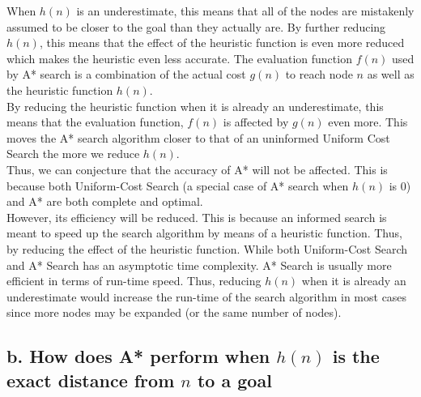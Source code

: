 \documentclass[11pt, A4]{article}
\begin{document}
When $h(n)$ is an underestimate, this means that all of the nodes are mistakenly assumed to be closer to the goal than they actually are. By further reducing $h(n)$, this means that the effect of the heuristic function is even more reduced which makes the heuristic even less accurate. The evaluation function $f(n)$ used by A* search is a combination of the actual cost $g(n)$ to reach node $n$ as well as the heuristic function $h(n)$. \\

\noindent By reducing the heuristic function when it is already an underestimate, this means that the evaluation function, $f(n)$ is affected by $g(n)$ even more. This moves the A* search algorithm closer to that of an uninformed Uniform Cost Search the more we reduce $h(n)$. \\

\noindent Thus, we can conjecture that the accuracy of A* will not be affected. This is because both Uniform-Cost Search (a special case of A* search when $h(n)$ is 0) and A* are both complete and optimal. \\

\noindent However, its efficiency will be reduced. This is because an informed search is meant to speed up the search algorithm by means of a heuristic function. Thus, by reducing the effect of the heuristic function. While both Uniform-Cost Search and A* Search has an asymptotic time complexity. A* Search is usually more efficient in terms of run-time speed. Thus, reducing $h(n)$ when it is already an underestimate would increase the run-time of the search algorithm in most cases since more nodes may be expanded (or the same number of nodes). 

\subsection*{b. How does A* perform when $h(n)$ is the exact distance from $n$ to a goal}
\end{document}
